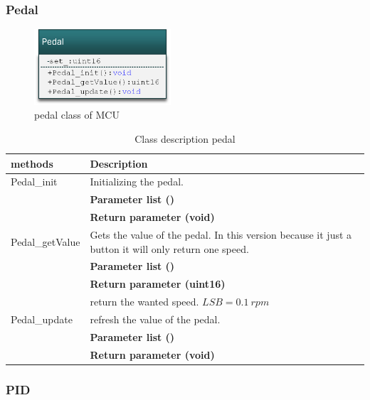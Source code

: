 \subsubsection{Pedal}

\begin{figure}[H]
	\centering
	\includegraphics [width=2in]{Software/Pictures/class-diagram-pedal.png}
	\caption{pedal class of MCU}
	\label{fig:Class_diagram_MCU_pedal}
\end{figure}

\begin{table}[H]
	\centering
	\begin{tabular}{|p{5 cm}|p{10 cm}|}
		\hline
		\textbf{methods} & \textbf{Description} \\ \hline
		
		Pedal\_init
		& Initializing the pedal.
		\\ & \textbf{Parameter list ()}
		\\ & \textbf{Return parameter (void)}
		\\ \hline
		
		Pedal\_getValue
		& Gets the value of the pedal. In this version because it just a button it will only return one speed.
		\\ & \textbf{Parameter list ()}
		\\ & \textbf{Return parameter (uint16)}
		\\ & return the wanted speed. $ LSB = \SI{0.1}{rpm} $
		\\ \hline
		
		Pedal\_update
		& refresh the value of the pedal. 
		\\ & \textbf{Parameter list ()}
		\\ & \textbf{Return parameter (void)}
		\\ \hline
		
	\end{tabular}
	\caption{Class description pedal}
	\label{table:Class_description_MCU_pedal}
\end{table}

\subsubsection{PID}

